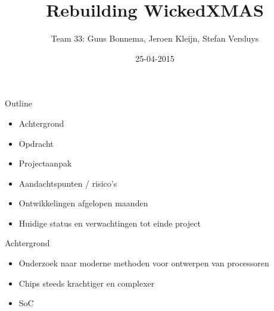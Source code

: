 \documentclass[10pt]{beamer}
\title[Plan]{Rebuilding WickedXMAS}
\author[Team33]{Team 33: Guus Bonnema, Jeroen Kleijn, Stefan Versluys}
\date{25-04-2015}
\institute[OU nl]{Open University The Netherlands}
\begin{document}
\newcommand{\xmas}{x\textsc{mas}}%
\newcommand{\ok}{$\checkmark$}


\frame{\maketitle}   %



\begin{frame}[label=outline]{Outline}

    \begin{itemize}
        \item Achtergrond
        \item Opdracht
        \item Projectaanpak
        \item Aandachtspunten / risico's
        \item Ontwikkelingen afgelopen maanden
        \item Huidige status en verwachtingen tot einde project
    \end{itemize}

\end{frame}

\begin{frame}[label=achtergrond]{Achtergrond}
 \begin{itemize}
  \item <1->Onderzoek naar moderne methoden voor ontwerpen van processoren
  \item <1->Chips steeds krachtiger en complexer
  \item <2->SoC
 \end{itemize}


\end{frame}
\end{document}
